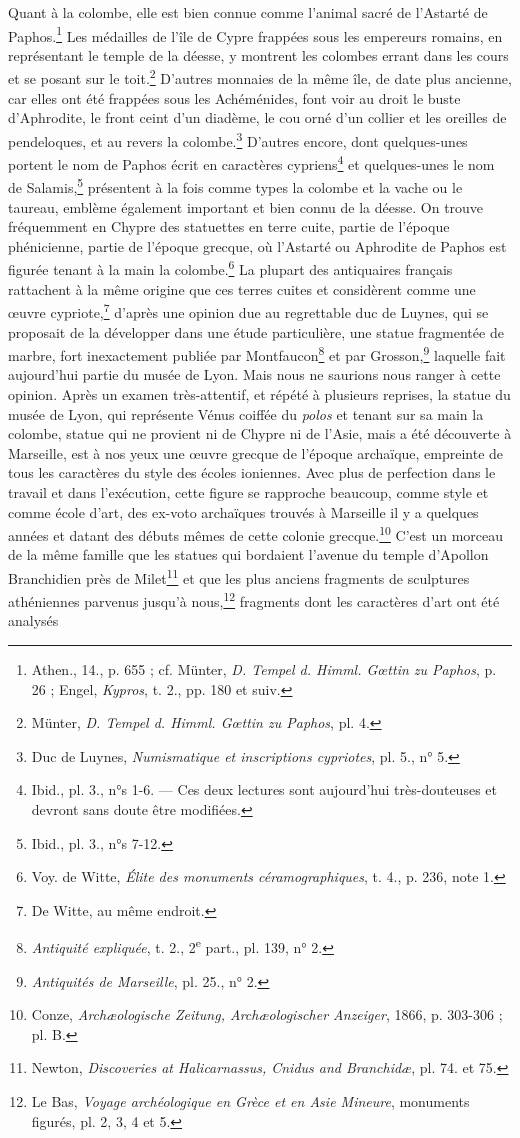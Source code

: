 \documentclass[a4paper, 11pt, oneside]{article}
\begin{document}
Quant à la colombe, elle est bien connue comme l'animal sacré de l'Astarté de Paphos.\footnote{Athen., 14., p. 655 ; cf. Münter, \emph{D. Tempel d. Himml. Gœttin zu Paphos}, p. 26 ; Engel, \emph{Kypros}, t. 2., pp. 180 et suiv.} Les médailles de l'île de Cypre frappées sous les empereurs romains, en représentant le temple de la déesse, y montrent les colombes errant dans les cours et se posant sur le toit.\footnote{Münter, \emph{D. Tempel d. Himml. Gœttin zu Paphos}, pl. 4.} D'autres monnaies de la même île, de date plus ancienne, car elles ont été frappées sous les Achéménides, font voir au droit le buste d'Aphrodite, le front ceint d'un diadème, le cou orné d'un collier et les oreilles de pendeloques, et au revers la colombe.\footnote{Duc de Luynes, \emph{Numismatique et inscriptions cypriotes}, pl. 5., n° 5.} D'autres encore, dont quelques-unes portent le nom de Paphos écrit en caractères cypriens\footnote{Ibid., pl. 3., n°s 1-6. --- Ces deux lectures sont aujourd'hui très-douteuses et devront sans doute être modifiées.} et quelques-unes le nom de Salamis,\footnote{Ibid., pl. 3., n°s 7-12.} présentent à la fois comme types la colombe et la vache ou le taureau, emblème également important et bien connu de la déesse. On trouve fréquemment en Chypre des statuettes en terre cuite, partie de l'époque phénicienne, partie de l'époque grecque, où l'Astarté ou Aphrodite de Paphos est figurée tenant à la main la colombe.\footnote{Voy. de Witte, \emph{Élite des monuments céramographiques}, t. 4., p. 236, note 1.} La plupart des antiquaires français rattachent à la même origine que ces terres cuites et considèrent comme une œuvre cypriote,\footnote{De Witte, au même endroit.} d'après une opinion due au regrettable duc de Luynes, qui se proposait de la développer dans une étude particulière, une statue fragmentée de marbre, fort inexactement publiée par Montfaucon\footnote{\emph{Antiquité expliquée}, t. 2., 2\textsuperscript{e} part., pl. 139, n° 2.} et par Grosson,\footnote{\emph{Antiquités de Marseille}, pl. 25., n° 2.} laquelle fait aujourd'hui partie du musée de Lyon. Mais nous ne saurions nous ranger à cette opinion. Après un examen très-attentif, et répété à plusieurs reprises, la statue du musée de Lyon, qui représente Vénus coiffée du \emph{polos} et tenant sur sa main la colombe, statue qui ne provient ni de Chypre ni de l'Asie, mais a été découverte à Marseille, est à nos yeux une œuvre grecque de l'époque archaïque, empreinte de tous les caractères du style des écoles ioniennes. Avec plus de perfection dans le travail et dans l'exécution, cette figure se rapproche beaucoup, comme style et comme école d'art, des ex-voto archaïques trouvés à Marseille il y a quelques années et datant des débuts mêmes de cette colonie grecque.\footnote{Conze, \emph{Archæologische Zeitung, Archæologischer Anzeiger}, 1866, p. 303-306 ; pl. B.} C'est un morceau de la même famille que les statues qui bordaient l'avenue du temple d'Apollon Branchidien près de Milet\footnote{Newton, \emph{Discoveries at Halicarnassus, Cnidus and Branchidæ}, pl. 74. et 75.} et que les plus anciens fragments de sculptures athéniennes parvenus jusqu'à nous,\footnote{Le Bas, \emph{Voyage archéologique en Grèce et en Asie Mineure}, monuments figurés, pl. 2, 3, 4 et 5.} fragments dont les caractères d'art ont été analysés 
\end{document}
